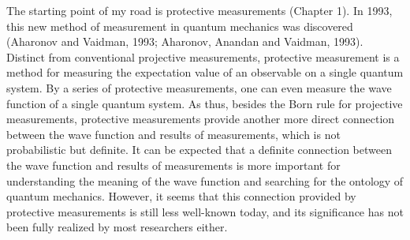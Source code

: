 The starting point of my road is protective measurements (Chapter 1).
In 1993, this new method of measurement in quantum mechanics was discovered (Aharonov and Vaidman, 1993; Aharonov, Anandan and Vaidman, 1993).
Distinct from conventional projective measurements, protective measurement is a method for measuring the expectation value of an observable on a single quantum system. By a series of protective measurements, one can even measure the wave function of a single quantum system.
As thus, besides the Born rule for projective measurements, protective measurements provide another more direct connection between the wave function and results of measurements, which is not probabilistic but definite.
It can be expected that a definite connection between the wave function and results of measurements is more important for understanding the meaning of the wave function and searching for the ontology of quantum mechanics.
However, it seems that this connection provided by protective measurements is still less well-known today, and its significance has not been fully realized by most researchers either.%

